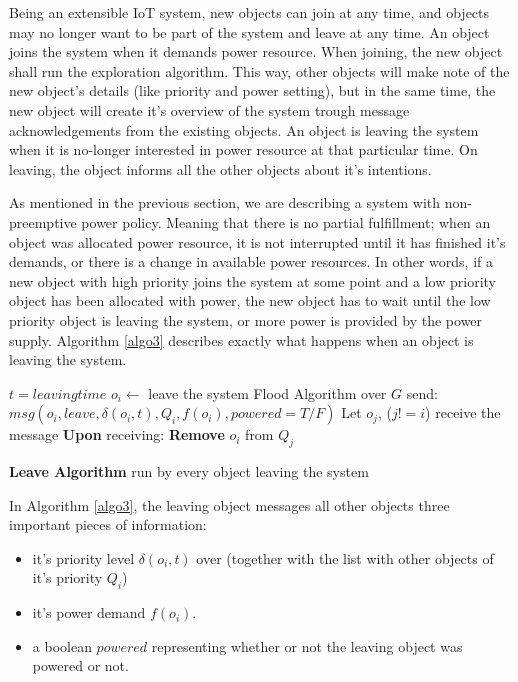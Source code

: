 \documentclass[../main/Self-Stabilization.tex]{subfiles}
\begin{document}
Being an extensible IoT system, new objects can join at any time, and objects may no longer want to be part of the system and leave at any time. An object joins the system when it demands power resource. When joining, the new object shall run the exploration algorithm. This way, other objects will make note of the new object's details (like priority and power setting), but in the same time, the new object will create it's overview of the system trough message acknowledgements from the existing objects. An object is leaving the system when it is no-longer interested in power resource at that particular time. On leaving, the object informs all the other objects about it's intentions.

As mentioned in the previous section, we are describing a system with non-preemptive power policy. Meaning that there is no partial fulfillment; when an object was allocated power resource, it is not interrupted until it has finished it's demands, or there is a change in available power resources. In other words, if a new object with high priority joins the system at some point and a low priority object has been allocated with power, the new object has to wait until the low priority object is leaving the system, or more power is provided by the power supply. Algorithm \ref{algo3} describes exactly what happens when an object is leaving the system.

\LinesNumbered
\IncMargin{1em}
\begin{algorithm}
$t = leaving time$
\BlankLine
$o_{i} \gets$ leave the system \newline
Flood Algorithm over $G$ \newline
send: $msg(o_{i}, leave,\delta(o_{i}, t), Q_{i}, f(o_{i}), powered=T/F)$
\BlankLine
{} {
    Let $o_{j}$, ($j!=i$) receive the message
    \BlankLine
    \textbf{Upon} receiving:\newline
     {
          \textbf{Remove} $o_{i}$ from $Q_{j}$
    }
}
\caption{\textbf{Leave Algorithm} run by every object leaving the system} \label{algo3}
\end{algorithm}
\DecMargin{1em}

In Algorithm \ref{algo3}, the leaving object messages all other objects three important pieces of information:
 \begin{itemize}
   \item it's priority level $\delta(o_{i}, t)$ over (together with the list with other objects of it's priority $Q_{i}$)
   \item it's power demand $f(o_{i})$.
   \item a boolean $powered$ representing whether or not the leaving object was powered or not.
 \end{itemize}
 
\end{document}
